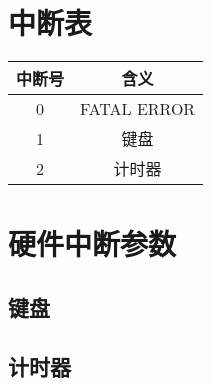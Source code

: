 \section{中断表}
\begin{tabular}{|c|c|}
    \hline
    中断号 & 含义\\\hline
    0     & FATAL ERROR\\\hline
    1     & 键盘\\\hline
    2     & 计时器\\\hline
\end{tabular}

\section{硬件中断参数}
\subsection{键盘}

\subsection{计时器}
